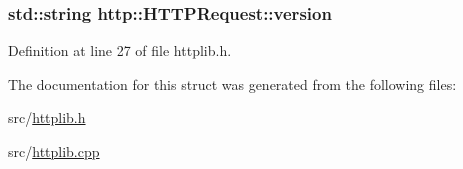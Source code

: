 \subsubsection[{\texorpdfstring{version}{version}}]{\setlength{\rightskip}{0pt plus 5cm}std\+::string http\+::\+H\+T\+T\+P\+Request\+::version}\hypertarget{structhttp_1_1HTTPRequest_af91d8e8634235a0fb97e7a526edcb810}{}\label{structhttp_1_1HTTPRequest_af91d8e8634235a0fb97e7a526edcb810}


Definition at line 27 of file httplib.\+h.



The documentation for this struct was generated from the following files\+:\begin{DoxyCompactItemize}
\item 
src/\hyperlink{httplib_8h}{httplib.\+h}\item 
src/\hyperlink{httplib_8cpp}{httplib.\+cpp}\end{DoxyCompactItemize}
